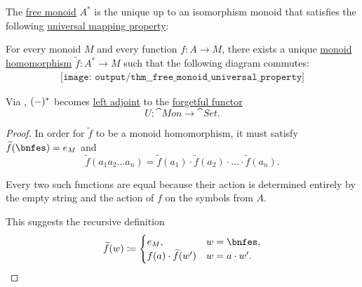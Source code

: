 \begin{theorem}\label{thm:free_monoid_universal_property}
  The \hyperref[def:free_monoid]{free monoid} \( A^* \) is the unique up to an isomorphism monoid that satisfies the following \hyperref[rem:universal_mapping_property]{universal mapping property}:
  \begin{displayquote}
    For every monoid \( M \) and every function \( f: A \to M \), there exists a unique \hyperref[def:monoid/homomorphism]{monoid homomorphism} \( \widetilde{f}: A^* \to M \) such that the following diagram commutes:
    \begin{equation}\label{eq:thm:free_monoid_universal_property/diagram}
      \begin{aligned}
        \texttt{[image: output/thm\_\_free\_monoid\_universal\_property]}
      \end{aligned}
    \end{equation}
  \end{displayquote}
\end{theorem}
\begin{comments}
  \item Via , \( (\Anon*)^* \) becomes \hyperref[def:category_adjunction]{left adjoint} to the \hyperref[def:concrete_category]{forgetful functor}
  \begin{equation*}
    U: \cat{Mon} \to \cat{Set}.
  \end{equation*}
\end{comments}
\begin{proof}
  In order for \( \widetilde{f} \) to be a monoid homomorphism, it must satisfy \( \widetilde{f}(\bnfes) = e_M \) and
  \begin{equation*}
    \widetilde{f}(a_1 a_2 \ldots a_n) = \widetilde{f}(a_1) \cdot \widetilde{f}(a_2) \cdot \ldots \cdot \widetilde{f}(a_n).
  \end{equation*}

  Every two such functions are equal because their action is determined entirely by the empty string and the action of \( f \) on the symbols from \( A \).

  This suggests the recursive definition
  \begin{equation*}
    \widetilde{f}(w) \coloneqq \begin{cases}
      e_M,                         &w = \bnfes, \\
      f(a) \cdot \widetilde{f}(w') &w = a \cdot w'.
    \end{cases}
  \end{equation*}
\end{proof}

